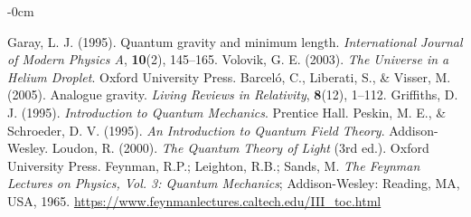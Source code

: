 \documentclass[entropy,article,submit,pdftex,moreauthors]{Definitions/mdpi}
\begin{document}
\begin{adjustwidth}{-\extralength}{0cm}
{\begin{thebibliography}{999}
Garay, L. J. (1995). Quantum gravity and minimum length. \textit{International Journal of Modern Physics A}, \textbf{10}(2), 145–165.
Volovik, G. E. (2003). \textit{The Universe in a Helium Droplet}. Oxford University Press.
Barceló, C., Liberati, S., \& Visser, M. (2005). Analogue gravity. \textit{Living Reviews in Relativity}, \textbf{8}(12), 1–112.
Griffiths, D. J. (1995). \textit{Introduction to Quantum Mechanics}. Prentice Hall.
Peskin, M. E., \& Schroeder, D. V. (1995). \textit{An Introduction to Quantum Field Theory}. Addison-Wesley.
Loudon, R. (2000). \textit{The Quantum Theory of Light} (3rd ed.). Oxford University Press.
Feynman, R.P.; Leighton, R.B.; Sands, M. \textit{The Feynman Lectures on Physics, Vol. 3: Quantum Mechanics}; Addison-Wesley: Reading, MA, USA, 1965. \url{https://www.feynmanlectures.caltech.edu/III_toc.html}


\end{thebibliography}
}



%


\end{adjustwidth}
\end{document}
